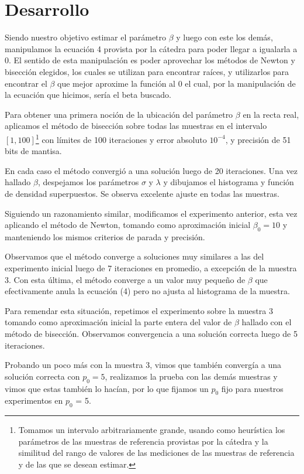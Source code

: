 \documentclass[a4paper,10pt,twoside]{article}
\begin{document}
\section{Desarrollo}
Siendo nuestro objetivo estimar el parámetro $\beta$ y luego con este los demás, manipulamos la ecuación 4 provista por la cátedra para poder llegar a igualarla a 0. El sentido de esta manipulación es poder aprovechar los métodos de Newton y bisección elegidos, los cuales se utilizan para encontrar raíces, y utilizarlos para encontrar el $\beta$ que mejor aproxime la función al 0 el cual, por la manipulación de la ecuación que hicimos, sería el beta buscado.

Para obtener una primera noción de la ubicación del parámetro $\beta$ en la
recta real, aplicamos el método de bisección sobre todas las muestras en el
intervalo $[1, 100]$\footnote{Tomamos un intervalo arbitrariamente grande,
usando como heurística los parámetros de las muestras de referencia provistas
por la cátedra y la similitud del rango de valores de las mediciones de las
muestras de referencia y de las que se desean estimar.} con límites de 100
iteraciones y error absoluto $10^{-4}$, y precisión de 51 bits de mantisa.

En cada caso el método convergió a una solución luego de 20 iteraciones.
Una vez hallado $\beta$, despejamos los parámetros $\sigma$ y $\lambda$ y
dibujamos el histograma y función de densidad superpuestos. Se observa
excelente ajuste en todas las muestras.

Siguiendo un razonamiento similar, modificamos el experimento anterior,
esta vez aplicando el método de Newton, tomando como aproximación inicial
$\beta_0 = 10$ y manteniendo los mismos criterios de parada y precisión.

Observamos que el método converge a soluciones muy similares a las del
experimento inicial luego de 7 iteraciones en promedio, a excepción de la
muestra 3. Con esta última, el método converge a un valor muy pequeño de
$\beta$ que efectivamente anula la ecuación (4) pero no ajusta al histograma
de la muestra.

Para remendar esta situación, repetimos el experimento sobre la muestra 3
tomando como aproximación inicial la parte entera del valor de $\beta$ hallado
con el método de bisección. Observamos convergencia a una solución correcta
luego de 5 iteraciones.

Probando un poco más con la muestra 3, vimos que también convergía a una
solución correcta con $p_0 = 5$, realizamos la prueba con las demás muestras
y vimos que estas también lo hacían, por lo que fijamos un $p_0$ fijo para
nuestros experimentos en $p_0$ = 5.
\end{document}
